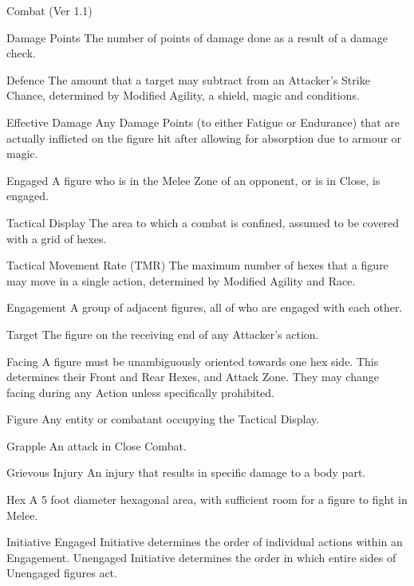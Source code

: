 \begin{Chapter}{Combat (Ver 1.1)}
\begin{Description}
\item[Damage Points] The number of points of damage done as a result
  of a damage check.

\item[Defence] The amount that a target may subtract from an
  Attacker’s Strike Chance, determined by Modified Agility, a shield,
  magic and conditions.

\item[Effective Damage] Any Damage Points (to either Fatigue or
  Endurance) that are actually inflicted on the figure hit after
  allowing for absorption due to armour or magic.

\item[Engaged] A figure who is in the Melee Zone of an opponent, or is
  in Close, is engaged.

\item[Tactical Display] The area to which a combat is confined,
  assumed to be covered with a grid of hexes.

\item[Tactical Movement Rate (TMR)] The maximum number of hexes that a
  figure may move in a single action, determined by Modified Agility
  and Race.

\item[Engagement] A group of adjacent figures, all of who are engaged
  with each other.

\item[Target] The figure on the receiving end of any Attacker’s
  action.

\item[Facing] A figure must be unambiguously oriented towards one hex
  side.  This determines their Front and Rear Hexes, and Attack Zone.
  They may change facing during any Action unless specifically
  prohibited.

\item[Figure] Any entity or combatant occupying the Tactical Display.

\item[Grapple] An attack in Close Combat.

\item[Grievous Injury] An injury that results in specific damage to a
  body part.

\item[Hex] A 5 foot diameter hexagonal area, with sufficient room for
  a figure to fight in Melee.

\item[Initiative] Engaged Initiative determines the order of
  individual actions within an Engagement. Unengaged Initiative
  determines the order in which entire sides of Unengaged figures act.


\end{Description}
\end{Chapter}
